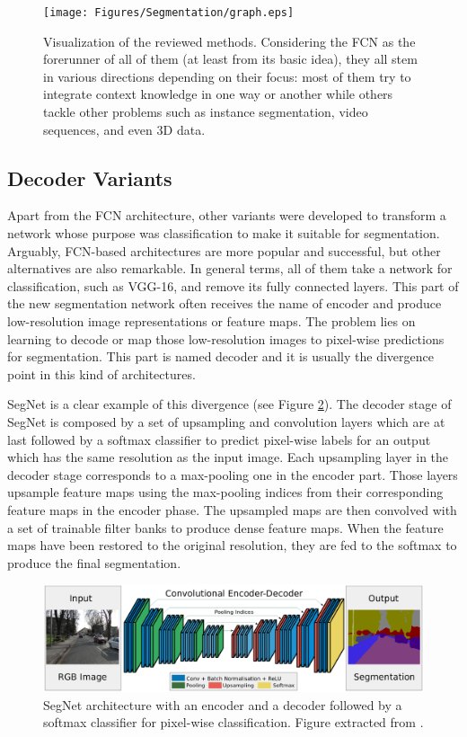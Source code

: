 \begin{figure}[!b]
	\centering
	\texttt{[image: Figures/Segmentation/graph.eps]}
	\caption{Visualization of the reviewed methods. Considering the \ac{FCN} as the forerunner of all of them (at least from its basic idea), they all stem in various directions depending on their focus: most of them try to integrate context knowledge in one way or another while others tackle other problems such as instance segmentation, video sequences, and even \ac{3D} data.}
	\label{fig:graph}
\end{figure}

\subsection{Decoder Variants}

Apart from the \acs{FCN} architecture, other variants were developed to transform a network whose purpose was classification to make it suitable for segmentation. Arguably, \acs{FCN}-based architectures are more popular and successful, but other alternatives are also remarkable. In general terms, all of them take a network for classification, such as \acs{VGG}-16, and remove its fully connected layers. This part of the new segmentation network often receives the name of encoder and produce low-resolution image representations or feature maps. The problem lies on learning to decode or map those low-resolution images to pixel-wise predictions for segmentation. This part is named decoder and it is usually the divergence point in this kind of architectures.

SegNet\cite{Badrinarayanan2015} is a clear example of this divergence (see Figure \ref{fig:semseg:segnet}). The decoder stage of SegNet is composed by a set of upsampling and convolution layers which are at last followed by a softmax classifier to predict pixel-wise labels for an output which has the same resolution as the input image. Each upsampling layer in the decoder stage corresponds to a max-pooling one in the encoder part. Those layers upsample feature maps using the max-pooling indices from their corresponding feature maps in the encoder phase. The upsampled maps are then convolved with a set of trainable filter banks to produce dense feature maps. When the feature maps have been restored to the original resolution, they are fed to the softmax to produce the final segmentation.

\begin{figure}[!hbt]
	\includegraphics[width=\linewidth]{Figures/Segmentation/segnet.eps}
	\caption{SegNet architecture with an encoder and a decoder followed by a softmax classifier for pixel-wise classification. Figure extracted from \cite{Badrinarayanan2015}.}
	\label{fig:semseg:segnet}
\end{figure}

